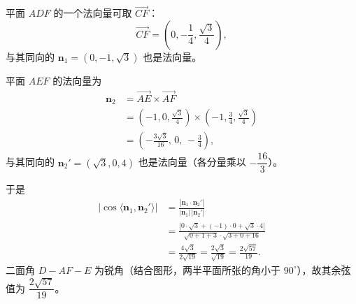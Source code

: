 \begin{answer}
平面 $ADF$ 的一个法向量可取 $\overrightarrow{CF}$：
\nopagebreak[4]
\[\overrightarrow{CF}=\left(0,-\frac14,\frac{\sqrt3}{4}\right),\]
与其同向的 $\boldsymbol n_1=(0,-1,\sqrt3)$ 也是法向量。

平面 $AEF$ 的法向量为
\nopagebreak[4]
\[\begin{aligned}
\boldsymbol n_2
&=\overrightarrow{AE}\times\overrightarrow{AF}\\
&=\left(-1,0,\frac{\sqrt3}{4}\right)\times\left(-1,\frac34,\frac{\sqrt3}{4}\right)\\
&=\left(-\frac{3\sqrt3}{16},\,0,\,-\frac34\right),
\end{aligned}\]
与其同向的 $\boldsymbol n_2'=(\sqrt3,0,4)$ 也是法向量（各分量乘以 $-\dfrac{16}{3}$）。

于是
\nopagebreak[4]
\[\begin{aligned}
|\cos\langle\boldsymbol n_1,\boldsymbol n_2'\rangle|
&=\frac{|\boldsymbol n_1\cdot\boldsymbol n_2'|}
{|\boldsymbol n_1|\,|\boldsymbol n_2'|}\\
&=\frac{|0\cdot\sqrt3+(-1)\cdot0+\sqrt3\cdot4|}
{\sqrt{0+1+3}\cdot\sqrt{3+0+16}}\\
&=\frac{4\sqrt3}{2\sqrt{19}}
=\frac{2\sqrt3}{\sqrt{19}}
=\frac{2\sqrt{57}}{19}.
\end{aligned}\]
二面角 $D-AF-E$ 为锐角（结合图形，两半平面所张的角小于 $90^\circ$），故其余弦值为 $\dfrac{2\sqrt{57}}{19}$。



\end{answer}
